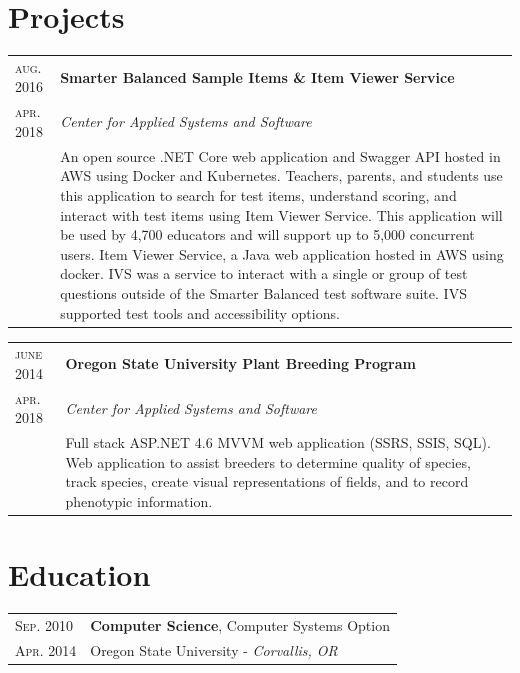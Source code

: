 \documentclass[10pt]{article}
\newenvironment{sectiontable}{ \begin{tabular}{p{16mm}|p{16cm}} }{ \end{tabular} }
\begin{document}
\section{Projects}

\begin{sectiontable}
{\small\textsc{aug. 2016}} 	& \textbf{Smarter Balanced Sample Items \& Item Viewer Service}\\
{\small\textsc{apr. 2018}}  & \emph{Center for Applied Systems and Software}\\
					& \rule{0pt}{2.3ex}\noindent    
An open source .NET Core web application and Swagger API hosted in AWS using Docker and Kubernetes. \newline
Teachers, parents, and students use this application to search for test items, understand scoring, and interact with test items using Item Viewer Service. This application will be used by 4,700 educators and will support up to 5,000 concurrent users. \newline
Item Viewer Service, a Java web application hosted in AWS using docker. IVS was a service to interact with a single or group of test questions outside of the Smarter Balanced test software suite. IVS supported test tools and accessibility options. 

\end{sectiontable} 


\begin{sectiontable}
{\small\textsc{june 2014}} 	& \textbf{Oregon State University Plant Breeding Program}\\
{\small\textsc{apr. 2018}}  & \emph{Center for Applied Systems and Software}\\
					& \rule{0pt}{2.3ex}\noindent    
Full stack ASP.NET 4.6 MVVM web application (SSRS, SSIS, SQL). \newline
Web application to assist breeders to determine quality of species, track species, create visual representations of fields, and to record phenotypic information. 
\end{sectiontable} 


\section{Education}

\begin{sectiontable}

{\small\textsc{Sep. 2010}} & \textbf{Computer Science}, Computer Systems Option\\ 
{\small\textsc{Apr. 2014}}	& Oregon State University - \emph{\small Corvallis, OR}\\

\end{sectiontable}
\end{document}
